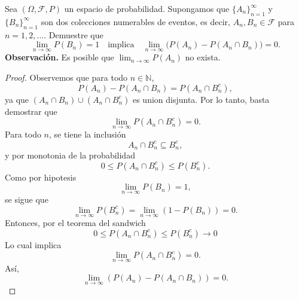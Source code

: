 \documentclass[12pt,a4paper]{article}
\begin{document}
    \begin{mdframed}[style=mdbluebox,frametitle={Ejercicio 7}]
        Sea $(\Omega,\mathcal{F},P)$ un espacio de probabilidad. Supongamos que
        $\{A_n\}_{n=1}^{\infty}$ y $\{B_n\}_{n=1}^{\infty}$ son dos colecciones numerables de eventos, es decir,
        $A_n,B_n\in\mathcal{F}$ para $n=1,2,\dots$. Demuestre que
        \[
            \lim_{n\to\infty}P(B_n)=1 \quad \text{implica} \quad
            \lim_{n\to\infty}\big(P(A_n)-P(A_n\cap B_n)\big)=0.
        \]
        \textbf{Observación.} Es posible que $\lim_{n\to\infty}P(A_n)$ no exista.
    \end{mdframed}

    \begin{proof}
        Observemos que para todo $n\in\mathbb{N}$,
        \begin{equation*}
            P(A_{n})-P(A_{n}\cap B_{n})=P(A_{n}\cap B_{n}^{c}),
        \end{equation*}
        ya que $(A_{n}\cap B_{n})\cup(A_{n}\cap B_{n}^{c})$ es union disjunta. Por lo tanto,
        basta demostrar que
        \begin{equation*}
            \lim_{n\to\infty}P(A_{n}\cap B_{n}^{c})=0.
        \end{equation*}
        Para todo $n$, se tiene la inclusión
        \begin{equation*}
            A_{n}\cap B_{n}^{c}\subseteq B_{n}^{c},
        \end{equation*}
        y por monotonia de la probabilidad
        \begin{equation*}
            0\leq P(A_{n}\cap B_{n}^{c})\leq P(B_{n}^{c}).
        \end{equation*}
        Como por hipotesis
        \begin{equation*}
            \lim_{n\to\infty}P(B_{n})=1,
        \end{equation*}
        se sigue que
        \begin{equation*}
            \lim_{n\to\infty}P(B_{n}^{c})=\lim_{n\to\infty}(1-P(B_{n}))=0.
        \end{equation*}
        Entonces, por el teorema del sandwich
        \begin{equation*}
            0\leq P(A_{n}\cap B_{n}^{c})\leq P(B_{n}^{c})\to0
        \end{equation*}
        Lo cual implica
        \begin{equation*}
            \lim_{n\to\infty}P(A_{n}\cap B_{n}^{c})=0.
        \end{equation*}
        Así,
        \begin{equation*}
            \lim_{n\to\infty}(P(A_{n})-P(A_{n}\cap B_{n}))=0.
        \end{equation*}
    \end{proof}
\end{document}
